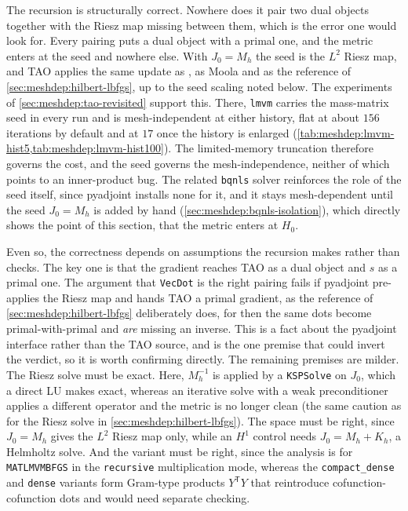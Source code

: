 \documentclass[a4paper,11pt]{article}
\theoremstyle{spacedplain} \newtheorem{theorem}[counter]{Theorem} \newtheorem{lemma}[counter]{Lemma} \newtheorem{prop}[counter]{Proposition} \newtheorem{cor}[counter]{Corollary}
\theoremstyle{spaceddefinition} \newtheorem{defn}[counter]{Definition} \newtheorem{example}[counter]{Example} \newtheorem{remark}[counter]{Remark}
\begin{document}
The recursion is structurally correct. Nowhere does it pair two dual objects together with the Riesz map missing between them, which is the error one would look for. Every pairing puts a dual object with a primal one, and the metric enters at the seed and nowhere else. With $J_0 = M_h$ the seed is the $L^{2}$ Riesz map, and TAO applies the same update as \citet[(1.210)]{shfp2017}, as Moola and as the reference of \cref{sec:meshdep:hilbert-lbfgs}, up to the seed scaling noted below. The experiments of \cref{sec:meshdep:tao-revisited} support this. There, \texttt{lmvm} carries the mass-matrix seed in every run and is mesh-independent at either history, flat at about $156$ iterations by default and at $17$ once the history is enlarged (\cref{tab:meshdep:lmvm-hist5,tab:meshdep:lmvm-hist100}). The limited-memory truncation therefore governs the cost, and the seed governs the mesh-independence, neither of which points to an inner-product bug. The related \texttt{bqnls} solver reinforces the role of the seed itself, since pyadjoint installs none for it, and it stays mesh-dependent until the seed $J_0 = M_h$ is added by hand (\cref{sec:meshdep:bqnls-isolation}), which directly shows the point of this section, that the metric enters at $H_0$.

Even so, the correctness depends on assumptions the recursion makes rather than checks. The key one is that the gradient reaches TAO as a dual object and $s$ as a primal one. The argument that \texttt{VecDot} is the right pairing fails if pyadjoint pre-applies the Riesz map and hands TAO a primal gradient, as the reference of \cref{sec:meshdep:hilbert-lbfgs} deliberately does, for then the same dots become primal-with-primal and \emph{are} missing an inverse. This is a fact about the pyadjoint interface rather than the TAO source, and is the one premise that could invert the verdict, so it is worth confirming directly. The remaining premises are milder. The Riesz solve must be exact. Here, $M_h^{-1}$ is applied by a \texttt{KSPSolve} on $J_0$, which a direct LU makes exact, whereas an iterative solve with a weak preconditioner applies a different operator and the metric is no longer clean (the same caution as for the Riesz solve in \cref{sec:meshdep:hilbert-lbfgs}). The space must be right, since $J_0 = M_h$ gives the $L^{2}$ Riesz map only, while an $H^{1}$ control needs $J_0 = M_h + K_h$, a Helmholtz solve. And the variant must be right, since the analysis is for \texttt{MATLMVMBFGS} in the \texttt{recursive} multiplication mode, whereas the \texttt{compact\_dense} and \texttt{dense} variants form Gram-type products $Y^{\mathsf T}Y$ that reintroduce cofunction-cofunction dots and would need separate checking.
\end{document}
